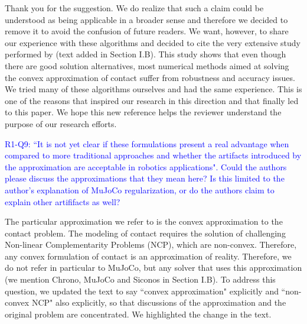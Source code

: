 Thank you for the suggestion. We do realize that such a claim could be
understood as being applicable in a broader sense and therefore we decided to
remove it to avoid the confusion of future readers. We want, however, to share
our experience with these algorithms and decided to cite the very extensive
study performed by \cite{bib:acary2018solving} (text added in Section I.B). This
study shows that even though there are good solution alternatives, most
numerical methods aimed at solving the convex approximation of contact suffer
from robustness and accuracy issues. We tried many of these algorithms ourselves
and had the same experience. This is one of the reasons that inspired our
research in this direction and that finally led to this paper. We hope this new
reference helps the reviewer understand the purpose of our research efforts.
\vspace{5mm}

\textcolor{blue}{R1-Q9: ``It is not yet clear if these formulations present a real
advantage when compared to more traditional approaches and whether the artifacts
introduced by the approximation are acceptable in robotics applications". Could
the authors please discuss the approximations that they mean here? Is this
limited to the author's explanation of MuJoCo regularization, or do the authors
claim to explain other artififacts as well?}

The particular approximation we refer to is the convex approximation
to the contact problem. The modeling of contact requires the solution of
challenging Non-linear Complementarity Problems (NCP), which are non-convex.
Therefore, any convex formulation of contact is an approximation of reality.
Therefore, we do not refer in particular to MuJoCo, but any solver that uses
this approximation (we mention Chrono, MuJoCo and Siconos in Section I.B).
To address this question, we updated the text to say ``convex approximation"
explicitly and ``non-convex NCP" also explicitly, so that discussions of the approximation
and the original problem are concentrated. We highlighted the change in the
text.
